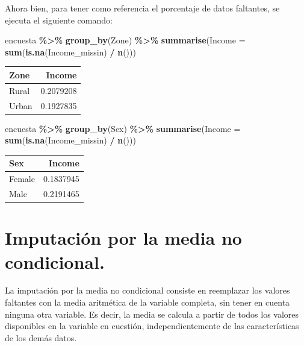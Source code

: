 \documentclass[
  spanish,
  12pt,
]{book}
\newenvironment{Shaded}{\begin{snugshade}}{\end{snugshade}}
\newcommand{\AttributeTok}[1]{\textcolor[rgb]{0.13,0.29,0.53}{#1}}
\newcommand{\FunctionTok}[1]{\textcolor[rgb]{0.13,0.29,0.53}{\textbf{#1}}}
\newcommand{\NormalTok}[1]{#1}
\newcommand{\SpecialCharTok}[1]{\textcolor[rgb]{0.81,0.36,0.00}{\textbf{#1}}}
\begin{document}
Ahora bien, para tener como referencia el porcentaje de datos faltantes, se ejecuta el siguiente comando:

\begin{Shaded}
\begin{Highlighting}[]
\NormalTok{encuesta }\SpecialCharTok{\%\textgreater{}\%} \FunctionTok{group\_by}\NormalTok{(Zone) }\SpecialCharTok{\%\textgreater{}\%} 
  \FunctionTok{summarise}\NormalTok{(}\AttributeTok{Income =} \FunctionTok{sum}\NormalTok{(}\FunctionTok{is.na}\NormalTok{(Income\_missin) }\SpecialCharTok{/} \FunctionTok{n}\NormalTok{()))}
\end{Highlighting}
\end{Shaded}

\begin{tabular}{l|r}
\hline
Zone & Income\\
\hline
Rural & 0.2079208\\
\hline
Urban & 0.1927835\\
\hline
\end{tabular}

\begin{Shaded}
\begin{Highlighting}[]
\NormalTok{encuesta }\SpecialCharTok{\%\textgreater{}\%} \FunctionTok{group\_by}\NormalTok{(Sex) }\SpecialCharTok{\%\textgreater{}\%} 
  \FunctionTok{summarise}\NormalTok{(}\AttributeTok{Income =} \FunctionTok{sum}\NormalTok{(}\FunctionTok{is.na}\NormalTok{(Income\_missin) }\SpecialCharTok{/} \FunctionTok{n}\NormalTok{()))}
\end{Highlighting}
\end{Shaded}

\begin{tabular}{l|r}
\hline
Sex & Income\\
\hline
Female & 0.1837945\\
\hline
Male & 0.2191465\\
\hline
\end{tabular}

\section{Imputación por la media no condicional.}\label{imputaciuxf3n-por-la-media-no-condicional.}

La imputación por la media no condicional consiste en reemplazar los valores faltantes con la media aritmética de la variable completa, sin tener en cuenta ninguna otra variable. Es decir, la media se calcula a partir de todos los valores disponibles en la variable en cuestión, independientemente de las características de los demás datos.
\end{document}
